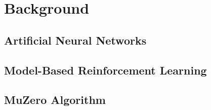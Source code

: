 \section{Background}

\subsection{Artificial Neural Networks}
\subsection{Model-Based Reinforcement Learning}
\subsection{MuZero Algorithm}

